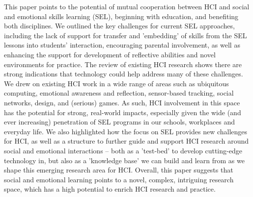 \documentclass[prodmode,acmtochi]{acmsmall}
\begin{document}
This paper points to the potential of mutual cooperation between HCI and social and emotional skills learning (SEL), beginning with education, and benefiting both disciplines.
%
We outlined the key challenges for current SEL approaches, including the lack of support for transfer and 'embedding' of skills from the SEL lessons into students' interaction, encouraging parental involvement, as well as enhancing the support for development of reflective abilities and novel environments for practice. 
%
The review of existing HCI research shows there are strong indications that technology could help address many of these challenges. We drew on existing HCI work in a wide range of areas such as ubiquitous computing, emotional awareness and reflection, sensor-based tracking, social networks, design, and (serious) games. As such, HCI involvement in this space has the potential for strong, real-world impacts, especially given the wide (and ever increasing) penetration of SEL programs in our schools, workplaces and everyday life.  
%
We also highlighted how the focus on SEL provides new challenges for HCI, as well as a structure to further guide and support HCI research around social and emotional interactions -- both as a 'test-bed' to develop cutting-edge technology in, but also as a 'knowledge base' we can build and learn from as we shape this emerging research area for HCI. 
%
Overall, this paper suggests that social and emotional learning points to a novel, complex, intriguing research space, which has a high potential to enrich HCI research and practice.







%



%
\end{document}
